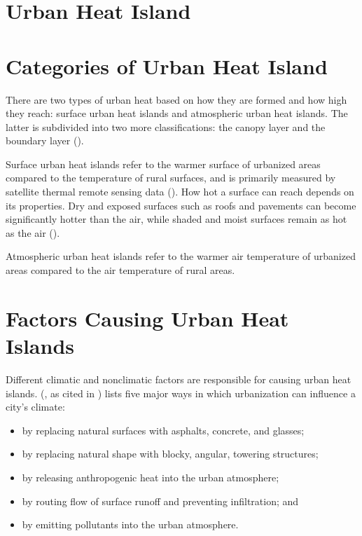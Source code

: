 \section{Urban Heat Island}

	\section{Categories of Urban Heat Island}
	
	There are two types of urban heat based on how they are formed and how high they reach:
	surface urban heat islands and atmospheric urban heat islands.
	The latter is subdivided into two more classifications:
	the canopy layer and the boundary layer (\cite{Zhou2018}).
	
	Surface urban heat islands refer to the warmer surface of urbanized areas compared to the temperature of rural surfaces, and is primarily measured by satellite thermal remote sensing data (\cite{Zhou2018}). 
	How hot a surface can reach depends on its properties.
	Dry and exposed surfaces such as roofs and pavements can become significantly hotter than the air, while shaded and moist surfaces remain as hot as the air (\cite{Khan2021}). 
	
	Atmospheric urban heat islands refer to the warmer air temperature of urbanized areas compared to the air temperature of rural areas.
	
	\section{Factors Causing Urban Heat Islands}
	
	Different climatic and nonclimatic factors are responsible for causing urban heat islands.
	\citeauthor{Bridgman1995} (\citeyear{Bridgman1995}, as cited in \cite{Khan2021}) lists five major ways in which urbanization can influence a city's climate:
	\begin{itemize}
		\item by replacing natural surfaces with asphalts, concrete, and glasses;
		\item by replacing natural shape with blocky, angular, towering structures;
		\item by releasing anthropogenic heat into the urban atmosphere;
		\item by routing flow of surface runoff and preventing infiltration; and
		\item by emitting pollutants into the urban atmosphere.
	\end{itemize}